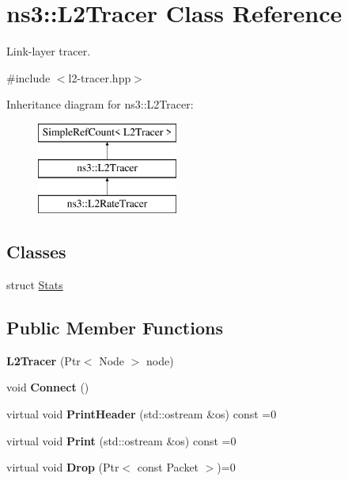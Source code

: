 \hypertarget{classns3_1_1L2Tracer}{}\section{ns3\+:\+:L2\+Tracer Class Reference}
\label{classns3_1_1L2Tracer}


Link-\/layer tracer.  




{\ttfamily \#include $<$l2-\/tracer.\+hpp$>$}

Inheritance diagram for ns3\+:\+:L2\+Tracer\+:\begin{figure}[H]
\begin{center}
\leavevmode
\includegraphics[height=3.000000cm]{classns3_1_1L2Tracer}
\end{center}
\end{figure}
\subsection*{Classes}
\begin{DoxyCompactItemize}
\item 
struct \hyperlink{structns3_1_1L2Tracer_1_1Stats}{Stats}
\end{DoxyCompactItemize}
\subsection*{Public Member Functions}
\begin{DoxyCompactItemize}
\item 
{\bfseries L2\+Tracer} (Ptr$<$ Node $>$ node)\hypertarget{classns3_1_1L2Tracer_a4444c9234f39684005ae15d7719ba326}{}\label{classns3_1_1L2Tracer_a4444c9234f39684005ae15d7719ba326}

\item 
void {\bfseries Connect} ()\hypertarget{classns3_1_1L2Tracer_af776f83c6e75e89ac5161c8f7dab0d86}{}\label{classns3_1_1L2Tracer_af776f83c6e75e89ac5161c8f7dab0d86}

\item 
virtual void {\bfseries Print\+Header} (std\+::ostream \&os) const =0\hypertarget{classns3_1_1L2Tracer_acfb29c0af352933ec774bdecdba59c35}{}\label{classns3_1_1L2Tracer_acfb29c0af352933ec774bdecdba59c35}

\item 
virtual void {\bfseries Print} (std\+::ostream \&os) const =0\hypertarget{classns3_1_1L2Tracer_a2a2f65c4b0ce36970e5e64c36e118b00}{}\label{classns3_1_1L2Tracer_a2a2f65c4b0ce36970e5e64c36e118b00}

\item 
virtual void {\bfseries Drop} (Ptr$<$ const Packet $>$)=0\hypertarget{classns3_1_1L2Tracer_a93165691794394afb0b06c3a75184519}{}\label{classns3_1_1L2Tracer_a93165691794394afb0b06c3a75184519}

\end{DoxyCompactItemize}
